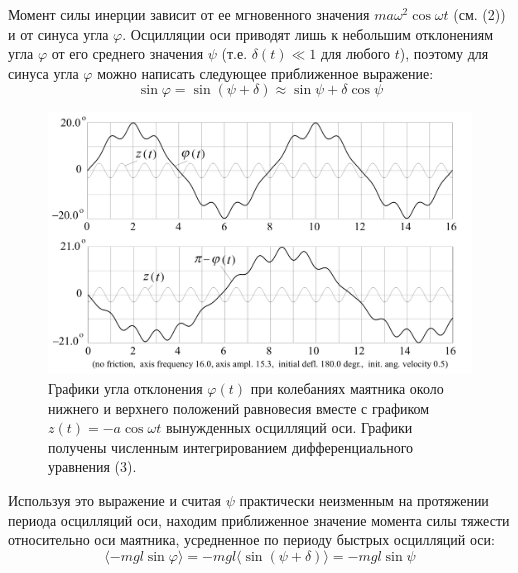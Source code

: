 \documentclass[a4paper,12pt]{article} %
\begin{document}
Момент силы инерции зависит от ее мгновенного значения $ma\omega^2 \cos\omega t$ (см. (2)) и от синуса угла $\varphi$. Осцилляции оси приводят лишь к небольшим отклонениям угла $\varphi$ от его среднего значения $\psi$ (т.е. $\delta(t) \ll 1$ для любого $t$), поэтому для синуса угла $\varphi$ можно написать следующее приближенное выражение:
\begin{equation}
\sin\varphi = \sin(\psi + \delta) \approx \sin\psi + \delta\cos\psi
\end{equation}
\begin{figure}[h]
\centering
\includegraphics[scale=0.35]{7}
\caption{Графики угла отклонения $\varphi(t)$ при колебаниях маятника около нижнего и верхнего положений равновесия вместе с графиком $z(t) = -a\cos\omega t$ вынужденных осцилляций оси. Графики получены численным интегрированием дифференциального уравнения (3).}
\end{figure}

Используя это выражение и считая $\psi$ практически неизменным на протяжении периода осцилляций оси, находим приближенное значение момента силы тяжести относительно оси маятника, усредненное по периоду быстрых осцилляций оси:
\begin{equation}
\langle-mgl\sin\varphi\rangle = -mgl\langle\sin(\psi+\delta)\rangle = -mgl\sin\psi
\end{equation}
\end{document}
